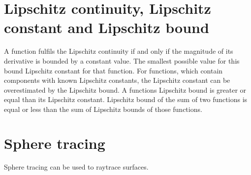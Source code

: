 \section{Lipschitz continuity, Lipschitz constant and Lipschitz bound}
A function fulfils the Lipschitz continuity if and only if the magnitude of its derivative is bounded by a constant value. The smallest possible value for this bound Lipschitz constant for that function. For functions, which contain components with known Lipschitz constants, the Lipschitz constant can be overestimated by the Lipschitz bound. A functions Lipschitz bound is greater or equal than its Lipschitz constant. Lipschitz bound of the sum of two functions is equal or less than the sum of Lipschitz bounds of those functions. 
\cite{hart:1996:sphere} \cite{Heuser:2003}

\section{Sphere tracing}
\cite{hart:1996:sphere}

Sphere tracing can be used to raytrace surfaces.










